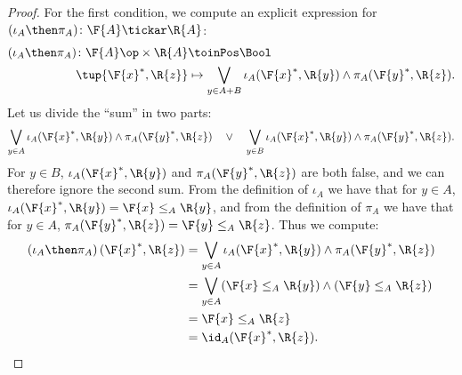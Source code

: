 \begin{proof}
    For the first condition, we compute  an explicit expression for $(\iota_A\then \pi_A) \colon \F{A} \tickar \R{A}$:
    \begin{equation}
    \begin{aligned}
        (\iota_A\then \pi_A) \colon  \F{A}\op\times \R{A} & \toinPos \Bool \\
                            \tup{\F{x}^*, \R{z}} &\mapsto
                            \bigvee_{y \in A + B} \iota_A(\F{x}^*,\R{y}) \wedge \pi_A(\F{y}^*,\R{z}).
    \end{aligned}
    \end{equation}
    Let us divide the ``sum'' in two parts:
    \begin{equation}
    \bigvee_{y \in A} \iota_A(\F{x}^*,\R{y}) \wedge \pi_A(\F{y}^*,\R{z}) \quad\vee\quad
    \bigvee_{y \in B} \iota_A(\F{x}^*,\R{y}) \wedge \pi_A(\F{y}^*,\R{z}).
    \end{equation}
    For $y \in B$, $\iota_A(\F{x}^*,\R{y})$ and $\pi_A(\F{y}^*,\R{z})$ are both false, and we can therefore ignore the second sum.
    From the definition of $\iota_A$ we have that for $y\in A$, $ \iota_A(\F{x}^*,\R{y})=\F{x} \leq_A \R{y}$, and from the definition of $\pi_A$ we have that for $y\in A$, $\pi_A(\F{y}^*,\R{z})=\F{y} \leq_A \R{z}$. Thus we compute:
\begin{equation}
    \begin{aligned}
    \left(\iota_A\then \pi_A\right)(\F{x}^*, \R{z}) &= \bigvee_{y \in A} \iota_A(\F{x}^*,\R{y}) \wedge \pi_A(\F{y}^*,\R{z})  \\
     &= \bigvee_{y \in A} (\F{x} \leq_A \R{y}) \wedge  (\F{y} \leq_A \R{z}) \\
     &= \F{x} \leq_A \R{z}\\
     &= \id_A(\F{x}^*, \R{z}).
\end{aligned}
\end{equation}
\end{proof}

